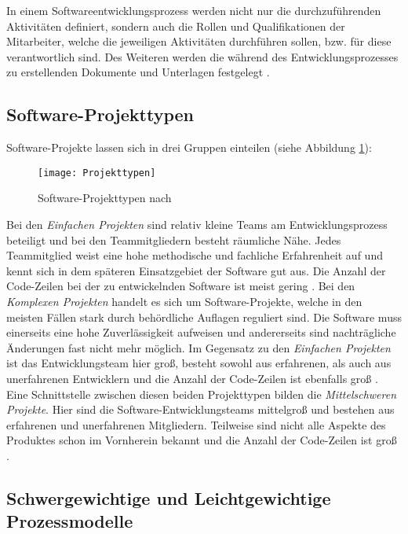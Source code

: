 In einem Softwareentwicklungsprozess werden nicht nur die durchzuführenden Aktivitäten definiert, sondern auch die Rollen und Qualifikationen der Mitarbeiter, welche die jeweiligen Aktivitäten durchführen sollen, bzw. für diese verantwortlich sind. Des Weiteren werden die während des Entwicklungsprozesses zu erstellenden Dokumente und Unterlagen festgelegt \cite{Hanser2010}.

\subsection{Software-Projekttypen}

Software-Projekte lassen sich in drei Gruppen einteilen (siehe Abbildung \ref{fig:Projekttypen}):
\begin{figure}[htp]
\begin{center}
  \texttt{[image: Projekttypen]} %
  \caption{Software-Projekttypen nach \cite{Boehm81}}
  \label{fig:Projekttypen}
\end{center}
\end{figure}
Bei den \textit{Einfachen Projekten} sind relativ kleine Teams am Entwicklungsprozess beteiligt und bei den Teammitgliedern besteht räumliche Nähe. Jedes Teammitglied weist eine hohe methodische und fachliche Erfahrenheit auf und kennt sich in dem späteren Einsatzgebiet der Software gut aus. Die Anzahl der Code-Zeilen bei der zu entwickelnden Software ist meist gering \cite{Boehm81, Hanser2010}. \newline
Bei den \textit{Komplexen Projekten} handelt es sich um Software-Projekte, welche in den meisten Fällen stark durch behördliche Auflagen reguliert sind. Die Software muss einerseits eine hohe Zuverlässigkeit aufweisen und andererseits sind nachträgliche Änderungen fast nicht mehr möglich. Im Gegensatz zu den \textit{Einfachen Projekten} ist das Entwicklungsteam hier groß, besteht sowohl aus erfahrenen, als auch aus unerfahrenen Entwicklern und die Anzahl der Code-Zeilen ist ebenfalls groß \cite{Boehm81, Hanser2010}. \newline
Eine Schnittstelle zwischen diesen beiden Projekttypen bilden die \textit{Mittelschweren Projekte}. Hier sind die Software-Entwicklungsteams mittelgroß und bestehen aus erfahrenen und unerfahrenen Mitgliedern. Teilweise sind nicht alle Aspekte des Produktes schon im Vornherein bekannt und die Anzahl der Code-Zeilen ist groß \cite{Boehm81, Hanser2010}.

\subsection{Schwergewichtige und Leichtgewichtige Prozessmodelle}

